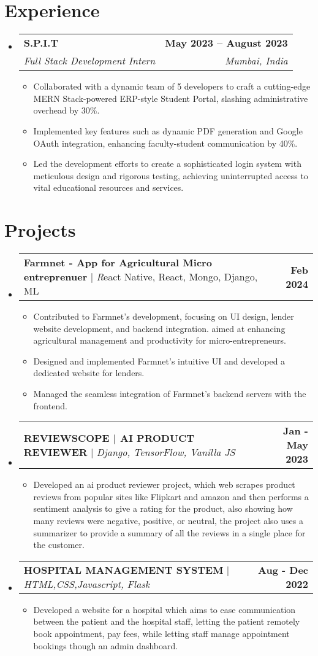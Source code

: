 \documentclass[letterpaper,11pt]{article}
\makeatletter
\newcommand{\resumeItem}[1]{
  \item\small{
    {#1 \vspace{-2pt}}
  }
}
\newcommand{\resumeSubheading}[4]{
  \vspace{-2pt}\item
    \begin{tabular*}{1.0\textwidth}[t]{l@{\extracolsep{\fill}}r}
      \textbf{#1} & \textbf{\small #2} \\
      \textit{\small#3} & \textit{\small #4} \\
    \end{tabular*}\vspace{-7pt}
}
\newcommand{\resumeProjectHeading}[2]{
    \item
    \begin{tabular*}{1.001\textwidth}{l@{\extracolsep{\fill}}r}
      \small#1 & \textbf{\small #2}\\
    \end{tabular*}\vspace{-7pt}
}
\newcommand{\resumeSubHeadingListStart}{\begin{itemize}[leftmargin=0.0in, label={}]}
\newcommand{\resumeSubHeadingListEnd}{\end{itemize}}
\newcommand{\resumeItemListStart}{\begin{itemize}}
\newcommand{\resumeItemListEnd}{\end{itemize}\vspace{-5pt}}
\makeatother
\begin{document}
\section{Experience}
  \resumeSubHeadingListStart
    \resumeSubheading
      {S.P.I.T}{May 2023 -- August 2023}
      {Full Stack Development Intern}{Mumbai, India}
      \resumeItemListStart
        \resumeItem{Collaborated with a dynamic team of 5 developers to craft a cutting-edge MERN Stack-powered ERP-style Student Portal, slashing administrative overhead by 30\%.}
        \resumeItem{Implemented key features such as dynamic PDF generation and Google OAuth integration, enhancing faculty-student communication by 40\%.}
        \resumeItem{Led the development efforts to create a sophisticated login system with meticulous design and rigorous testing, achieving uninterrupted access to vital educational resources and services.}
      \resumeItemListEnd
    \resumeSubHeadingListEnd
\vspace{-16pt}

\section{Projects}
    \resumeSubHeadingListStart
    \vspace{-8pt}
          \resumeProjectHeading
          {\textbf{Farmnet - App for Agricultural Micro entreprenuer} $|$ \emph React Native, React, Mongo, Django, ML}{Feb 2024}
          \resumeItemListStart
            \resumeItem{Contributed to Farmnet's development, focusing on UI design, lender website development, and backend integration. aimed at enhancing agricultural management and productivity for micro-entrepreneurs.}
            \resumeItem{Designed and implemented Farmnet's intuitive UI and developed a dedicated website for lenders.}
            \resumeItem{Managed the seamless integration of Farmnet's backend servers with the frontend.}
          \resumeItemListEnd
          \vspace{-20pt}
      \resumeProjectHeading
          {\textbf{REVIEWSCOPE | AI PRODUCT REVIEWER} $|$ \emph{Django, TensorFlow, Vanilla JS}}{Jan - May 2023}
          \resumeItemListStart
            \resumeItem{Developed an ai product reviewer project, which web scrapes product reviews from popular sites like Flipkart and amazon and
then performs a sentiment analysis to give a rating for the product, also showing how many reviews were negative, positive, or
neutral, the project also uses a summarizer to provide a summary of all the reviews in a single place for the customer.}
          \resumeItemListEnd
          \vspace{-13pt}
      \resumeProjectHeading
          {\textbf{HOSPITAL MANAGEMENT SYSTEM } $|$ \emph{HTML,CSS,Javascript, Flask}}{Aug - Dec 2022}
          \resumeItemListStart
            \resumeItem{Developed a website for a hospital which aims to ease communication between the patient and the hospital staff, letting the
patient remotely book appointment, pay fees, while letting staff manage appointment bookings though an admin dashboard.}
          \resumeItemListEnd  
    \resumeSubHeadingListEnd
\vspace{-15pt}
\end{document}
